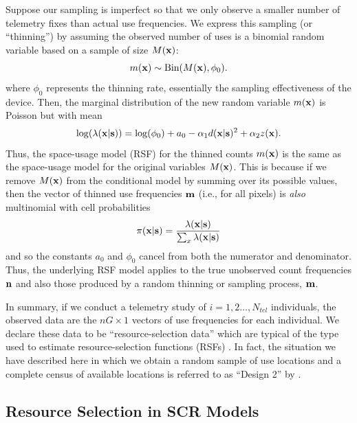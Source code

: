 \documentclass[12pt]{article}
\begin{document}
Suppose our sampling is imperfect so that we only observe a smaller
number of telemetry fixes than actual use
frequencies.
We express this sampling (or ``thinning'') by assuming the observed number of
uses is a binomial random variable based on a sample of size $M({\bf
  x})$:
\[
 m({\bf x}) \sim \mbox{Bin}(M({\bf x}), \phi_{0}).
\]
where $\phi_{0}$
represents the thinning rate, essentially the
sampling effectiveness of the device.
 Then, the marginal distribution of the new random variable $m({\bf x})$ is
  Poisson
but with mean
\[
 \log(\lambda({\bf x}|{\bf s})) = \log(\phi_{0}) + a_{0} -\alpha_{1}
 d({\bf x}|{\bf s})^{2} +  \alpha_{2} z({\bf x}).
\]
 Thus, the space-usage model (RSF) for the
thinned counts $m({\bf x})$ is the same as the space-usage model for the
original variables $M({\bf x})$.  This is because if we remove $M({\bf
x})$
from the conditional
 model by summing over its possible values, then the vector of thinned
 use frequencies
${\bf m}$ (i.e., for all pixels) is {\it also}  multinomial with cell probabilities
\[
\pi({\bf x}|{\bf s}) = \frac{\lambda({\bf x}|{\bf s})}{\sum_{x}  \lambda({\bf x}|{\bf s})}
\]
and so the constants $a_{0}$ and $\phi_{0}$
cancel from both the numerator and
denominator. Thus, the underlying RSF model applies to the true
unobserved count frequencies ${\bf n}$ and also those produced
by a random thinning or sampling process, ${\bf m}$.

In summary, if we conduct a telemetry study of $i=1,2\ldots,N_{tel}$
individuals, the observed data are
the $nG \times 1$  vectors of use frequencies
for each individual.
 We declare these data to be
``resource-selection data'' which are typical of the type used to
estimate resource-selection functions (RSFs) \citep{manly_etal:2002}.
In fact, the situation we have described here in which
we obtain a random sample
of use locations and a complete census of available locations is
referred to as ``Design 2'' by \citep{manly_etal:2002}.



\subsection{Resource Selection in SCR Models}
\end{document}
